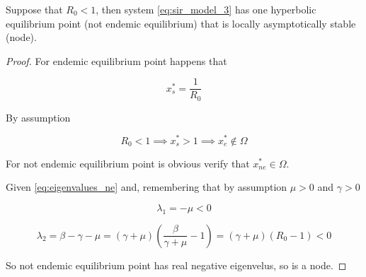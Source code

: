 \begin{theorem}
\label{th:R0_minor_then_1_Equilibria}
Suppose that $R_0 < 1$, then system \ref{eq:sir_model_3} has one hyperbolic equilibrium point (not endemic equilibrium) that is locally asymptotically stable (node).
\end{theorem}

\begin{proof}
For endemic equilibrium point happens that

\begin{equation}
    x_s^* = \frac{1}{R_0}
\end{equation}

By assumption

\begin{equation}
    R_0 < 1 \implies x_s^* > 1 \implies x_e^* \not\in \Omega
\end{equation}

For not endemic equilibrium point is obvious verify that $x_{ne}^* \in \Omega$.

Given \ref{eq:eigenvalues_ne} and, remembering that by assumption $\mu > 0$ and $\gamma > 0$

\begin{equation}
    \lambda_1 = -\mu < 0
\end{equation}

\begin{equation}
    \lambda_2 = \beta - \gamma - \mu = (\gamma + \mu)\left(\frac{\beta}{\gamma + \mu} - 1\right) = (\gamma + \mu)(R_0 - 1) < 0
\end{equation}

So not endemic equilibrium point has real negative eigenvelus, so is a node.
\end{proof}